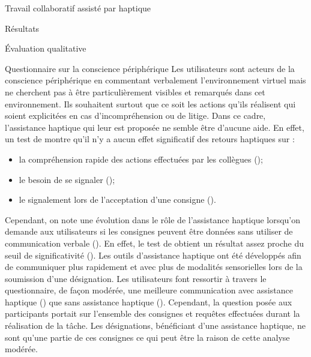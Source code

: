 \documentclass[myfrancais,ngerman,english,frenchb]{mythesis}
\begin{document}
\begin{mychapter}{Travail collaboratif assisté par haptique}
\begin{mysection}{Résultats}
\begin{mysubsection}{Évaluation qualitative}
\begin{mysubsubsection}{Questionnaire sur la conscience périphérique}
					Les utilisateurs sont acteurs de la conscience périphérique en commentant verbalement l'environnement virtuel mais ne cherchent pas à être particulièrement visibles et remarqués dans cet environnement.
					Ils souhaitent surtout que ce soit les actions qu'ils réalisent qui soient explicitées en cas d'incompréhension ou de litige.
					Dans ce cadre, l'assistance haptique qui leur est proposée ne semble être d'aucune aide.
					En effet, un test de  montre qu'il n'y a aucun effet significatif des retours haptiques sur :
					\begin{itemize}
						\item la compréhension rapide des actions effectuées par les collègues ();
						\item le besoin de se signaler ();
						\item le signalement lors de l'acceptation d'une consigne ().
					\end{itemize}

					Cependant, on note une évolution dans le rôle de l'assistance haptique lorsqu'on demande aux utilisateurs si les consignes peuvent être données sans utiliser de communication verbale ().
					En effet, le test de  obtient un résultat assez proche du seuil de significativité ().
					Les outils d'assistance haptique ont été développés afin de communiquer plus rapidement et avec plus de modalités sensorielles lors de la soumission d'une désignation.
					Les utilisateurs font ressortir à travers le questionnaire, de façon modérée, une meilleure communication avec assistance haptique () que sans assistance haptique ().
					Cependant, la question posée aux participants portait sur l'ensemble des consignes et requêtes effectuées durant la réalisation de la tâche.
					Les désignations, bénéficiant d'une assistance haptique, ne sont qu'une partie de ces consignes ce qui peut être la raison de cette analyse modérée.


\end{mysubsubsection}
\end{mysubsection}
\end{mysection}
\end{mychapter}
\end{document}
